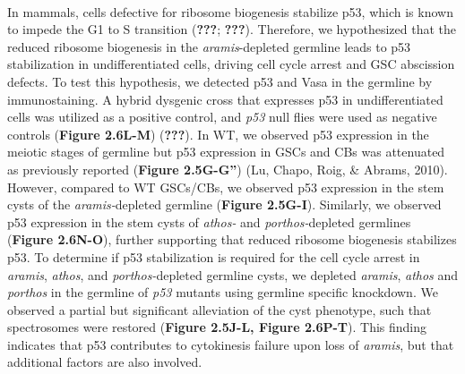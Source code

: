 \documentclass[12pt,oneside]{reedthesis}
\begin{document}

\textbf{\\
}

In mammals, cells defective for ribosome biogenesis stabilize p53, which is known to impede the G1 to S transition ({\textbf{???}}; {\textbf{???}}). Therefore, we hypothesized that the reduced ribosome biogenesis in the \emph{aramis}-depleted germline leads to p53 stabilization in undifferentiated cells, driving cell cycle arrest and GSC abscission defects. To test this hypothesis, we detected p53 and Vasa in the germline by immunostaining. A hybrid dysgenic cross that expresses p53 in undifferentiated cells was utilized as a positive control, and \emph{p53} null flies were used as negative controls (\textbf{Figure 2.6L-M}) ({\textbf{???}}). In WT, we observed p53 expression in the meiotic stages of germline but p53 expression in GSCs and CBs was attenuated as previously reported (\textbf{Figure 2.5G-G''}) (Lu, Chapo, Roig, \& Abrams, 2010). However, compared to WT GSCs/CBs, we observed p53 expression in the stem cysts of the \emph{aramis-}depleted germline (\textbf{Figure 2.5G-I}). Similarly, we observed p53 expression in the stem cysts of \emph{athos-} and \emph{porthos-}depleted germlines (\textbf{Figure 2.6N-O}), further supporting that reduced ribosome biogenesis stabilizes p53. To determine if p53 stabilization is required for the cell cycle arrest in \emph{aramis}, \emph{athos}, and \emph{porthos-}depleted germline cysts, we depleted \emph{aramis}, \emph{athos} and \emph{porthos} in the germline of \emph{p53} mutants using germline specific knockdown. We observed a partial but significant alleviation of the cyst phenotype, such that spectrosomes were restored (\textbf{Figure 2.5J-L, Figure 2.6P-T}). This finding indicates that p53 contributes to cytokinesis failure upon loss of \emph{aramis}, but that additional factors are also involved.
\end{document}
